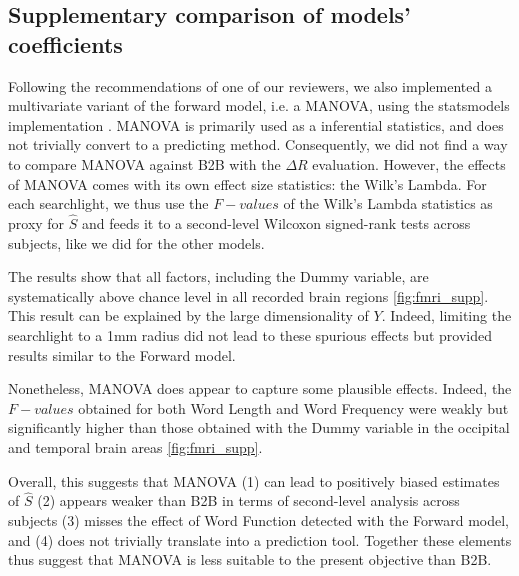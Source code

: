 \subsection{Supplementary comparison of models' coefficients}

Following the recommendations of one of our reviewers, we also implemented a
multivariate variant of the forward model, i.e. a MANOVA, using the statsmodels
implementation \citep{seabold2010statsmodels}. MANOVA is primarily used as a
inferential statistics, and does not trivially convert to a predicting method.
Consequently, we did not find a way to compare MANOVA against B2B with the
$\Delta R$ evaluation. However, the effects of MANOVA comes with its own effect
size statistics: the Wilk's Lambda. For each searchlight, we thus use the $F-values$ of the
Wilk's Lambda statistics as proxy for $\hat S$ and feeds it to a second-level
Wilcoxon signed-rank tests across subjects, like we did for the other models.

The results show that all factors, including the Dummy variable, are
systematically above chance level in all recorded brain regions \ref{fig:fmri_supp}. This result
can be explained by the large dimensionality of $Y$. Indeed, limiting the
searchlight to a 1mm radius did not lead to these spurious effects but provided
results similar to the Forward model.

Nonetheless, MANOVA does appear to capture some plausible effects. Indeed, the
$F-values$ obtained for both Word Length and Word Frequency were weakly but
significantly higher than those obtained with the Dummy variable in the
occipital and temporal brain areas \ref{fig:fmri_supp}.

Overall, this suggests that MANOVA (1) can lead to positively biased estimates of
$\hat S$ (2) appears weaker than B2B in terms of second-level analysis across
subjects (3) misses the effect of Word Function detected with the Forward model,
and (4) does not trivially translate into a prediction tool. Together these
elements thus suggest that MANOVA is less suitable to the present objective than
B2B.


